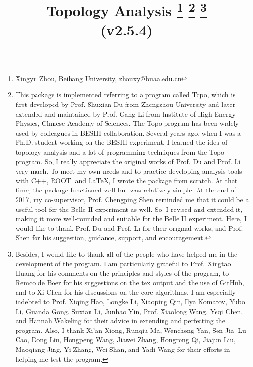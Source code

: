 \documentclass[landscape]{article}
\begin{document}
\title{Topology Analysis \footnote{\normalsize{Xingyu Zhou, Beihang University, zhouxy@buaa.edu.cn}} \footnote{\normalsize{This package is implemented referring to a program called {\sc Topo}, which is first developed by Prof. Shuxian Du from Zhengzhou University and later extended and maintained by Prof. Gang Li from Institute of High Energy Physics, Chinese Academy of Sciences. The {\sc Topo} program has been widely used by colleagues in BESIII collaboration. Several years ago, when I was a Ph.D. student working on the BESIII experiment, I learned the idea of topology analysis and a lot of programming techniques from the {\sc Topo} program. So, I really appreciate the original works of Prof. Du and Prof. Li very much. To meet my own needs and to practice developing analysis tools with C++, ROOT, and LaTeX, I wrote the package from scratch. At that time, the package functioned well but was relatively simple. At the end of 2017, my co-supervisor, Prof. Chengping Shen reminded me that it could be a useful tool for the Belle II experiment as well. So, I revised and extended it, making it more well-rounded and suitable for the Belle II experiment. Here, I would like to thank Prof. Du and Prof. Li for their original works, and Prof. Shen for his suggestion, guidance, support, and encouragement.}} \footnote{\normalsize{Besides, I would like to thank all of the people who have helped me in the development of the program. I am particularly grateful to Prof. Xingtao Huang for his comments on the principles and styles of the program, to Remco de Boer for his suggestions on the tex output and the use of GitHub, and to Xi Chen for his discussions on the core algorithms. I am especially indebted to Prof. Xiqing Hao, Longke Li, Xiaoping Qin, Ilya Komarov, Yubo Li, Guanda Gong, Suxian Li, Junhao Yin, Prof. Xiaolong Wang, Yeqi Chen, and Hannah Wakeling for their advice in extending and perfecting the program. Also, I thank Xi'an Xiong, Runqiu Ma, Wencheng Yan, Sen Jia, Lu Cao, Dong Liu, Hongpeng Wang, Jiawei Zhang, Hongrong Qi, Jiajun Liu, Maoqiang Jing, Yi Zhang, Wei Shan, and Yadi Wang for their efforts in helping me test the program.}} \\ \vspace{1cm} \Large{(v2.5.4)}}
\maketitle

\clearpage

\end{document}
